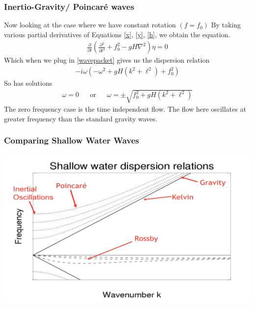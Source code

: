 \documentclass{beamer}
\newcommand{\grad}{\nabla}
\newcommand{\partiald}[2]{\frac{\partial {#1} }{\partial {#2}}}
\begin{document}
\begin{frame}
\frametitle{Inertio-Gravity/ Poincaré waves}
Now looking at the case where we have constant rotation $(f=f_0)$
By taking various partial derivatives of Equations \eqref{x}, \eqref{y}, \eqref{h}, we obtain the equation.
\begin{align}
\partiald{}{t}\left(\partiald{^2}{t^2}+f_0^2-gH\grad^2\right)\eta=0
\end{align}
Which when we plug in \eqref{wavepacket} gives us the dispersion relation
\begin{align}
-i\omega(-\omega^2+gH(k^2+\ell^2)+f_0^2)
\end{align}
So has solutions
\begin{align}
\omega=0 && \mathrm{or} && \omega=\pm\sqrt{f_0^2+gH(k^2+\ell^2)}
\end{align}
The zero frequency case is the time independent flow. The flow here oscillates at greater frequency than the standard gravity waves.

\end{frame}
\begin{frame}
\frametitle{Comparing Shallow Water Waves}
\centering\includegraphics[scale=0.25]{"Shallow Water Waves"}

\end{frame}
\end{document}
